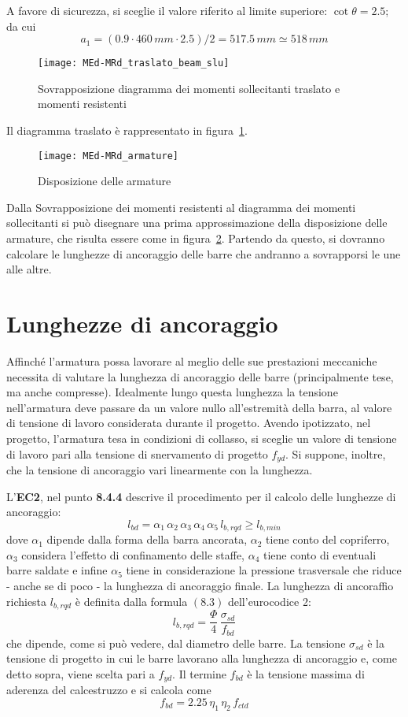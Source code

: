 A favore di sicurezza, si sceglie il valore riferito al limite superiore: $\cot\theta = 2.5$; da cui
\[
    a_1 = (0.9\cdot 460\,mm\cdot 2.5)/2 = 517.5\,mm\simeq 518\,mm
\]

\begin{figure}
    \centering
	\texttt{[image: MEd-MRd\_traslato\_beam\_slu]}
	\caption{Sovrapposizione diagramma dei momenti sollecitanti traslato e momenti resistenti}
	\label{fig:MEd-MRd_traslato}
\end{figure}

Il diagramma traslato è rappresentato in figura~\ref{fig:MEd-MRd_traslato}.

\begin{figure}
	\centering
	\texttt{[image: MEd-MRd\_armature]}
	\caption{Disposizione delle armature} 
	\label{fig:MEd-MRd_armature}
\end{figure}

Dalla Sovrapposizione dei momenti resistenti al diagramma dei momenti sollecitanti si può disegnare una prima approssimazione della disposizione delle armature, che risulta essere come in figura~\ref{fig:MEd-MRd_armature}. Partendo da questo, si dovranno calcolare le lunghezze di ancoraggio delle barre che andranno a sovrapporsi le une alle altre.

\section{Lunghezze di ancoraggio}\label{sec:ancoraggio}
Affinché l'armatura possa lavorare al meglio delle sue prestazioni meccaniche necessita di valutare la lunghezza di ancoraggio delle barre (principalmente tese, ma anche compresse). Idealmente lungo questa lunghezza la tensione nell'armatura deve passare da un valore nullo all'estremità della barra, al valore di tensione di lavoro considerata durante il progetto. Avendo ipotizzato, nel progetto, l'armatura tesa in condizioni di collasso, si sceglie un valore di tensione di lavoro pari alla tensione di snervamento di progetto $f_{yd}$. Si suppone, inoltre, che la tensione di ancoraggio vari linearmente con la lunghezza. 

L'\textbf{EC2}, nel punto \textbf{8.4.4} descrive il procedimento per il calcolo delle lunghezze di ancoraggio:
\[
l_{bd} = \alpha_1\,\alpha_2\,\alpha_3\,\alpha_4\,\alpha_5\,l_{b,rqd} \geq l_{b,min}
\]
dove $\alpha_1$ dipende dalla forma della barra ancorata, $\alpha_2$ tiene conto del copriferro, $\alpha_3$ considera l'effetto di confinamento delle staffe, $\alpha_4$ tiene conto di eventuali barre saldate e infine $\alpha_5$ tiene in considerazione la pressione trasversale che riduce - anche se di poco - la lunghezza di ancoraggio finale. La lunghezza di ancoraffio richiesta $l_{b,rqd}$ è definita dalla formula $(8.3)$ dell'eurocodice 2:
\[
l_{b,rqd} = \dfrac{\Phi}{4}\,\dfrac{\sigma_{sd}}{f_{bd}}
\]
che dipende, come si può vedere, dal diametro delle barre. La tensione $\sigma_{sd}$ è la tensione di progetto in cui le barre lavorano alla lunghezza di ancoraggio e, come detto sopra, viene scelta pari a $f_{yd}$. Il termine $f_{bd}$ è la tensione massima di aderenza del calcestruzzo e si calcola come
\[
f_{bd} = 2.25\,\eta_1\,\eta_2\,f_{ctd}
\]

